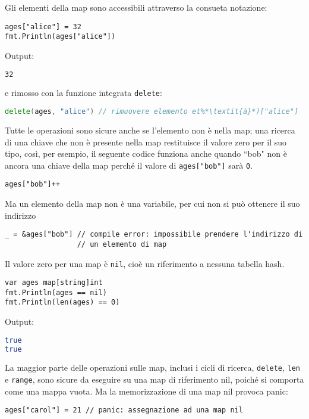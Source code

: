 \documentclass[../../thesis.tex]{subfiles}
\begin{document}
    Gli elementi della map sono accessibili attraverso la consueta notazione:
    \begin{lstlisting}[frame = single, label = {lst:lstlisting3-3.4}]
ages["alice"] = 32
fmt.Println(ages["alice"])
    \end{lstlisting}
    Output:
    \begin{lstlisting}[language = bash, frame = L, label = {lst:lstlisting3-3.5}]
32
    \end{lstlisting}
    e rimosso con la funzione integrata \verb"delete":
    \begin{lstlisting}[language = go, frame = single, label = {lst:lstlisting3-3.6}]
delete(ages, "alice") // rimuovere elemento et%*\textit{à}*)["alice"]
    \end{lstlisting}
    Tutte le operazioni sono sicure anche se l'elemento non è nella map;
    una ricerca di una chiave che non è presente nella map restituisce il valore zero per il suo tipo, così, per esempio, il seguente codice funziona anche quando ``bob" non è ancora una chiave della map perché il valore di \verb!ages["bob"]! sarà \verb"0".
    \begin{lstlisting}[frame = single, label = {lst:lstlisting3-3.7}]
ages["bob"]++
    \end{lstlisting}
    Ma un elemento della map non è una variabile, per cui non si può ottenere il suo indirizzo
    \begin{lstlisting}[frame = single, label = {lst:lstlisting3-3.8}]
_ = &ages["bob"] // compile error: impossibile prendere l'indirizzo di
                 // un elemento di map
    \end{lstlisting}
    Il valore zero per una map è \verb"nil", cioè un riferimento a nessuna tabella hash.
    \begin{lstlisting}[frame = single, label = {lst:lstlisting3-3.9}]
var ages map[string]int
fmt.Println(ages == nil)
fmt.Println(len(ages) == 0)
    \end{lstlisting}
    Output:
    \begin{lstlisting}[language = bash, frame = L, label = {lst:lstlisting3-3.10}]
true
true
    \end{lstlisting}
    La maggior parte delle operazioni sulle map, inclusi i cicli di ricerca, \verb"delete", \verb"len" e \verb"range", sono sicure da eseguire su una map di riferimento nil, poiché si comporta come una mappa vuota.
    Ma la memorizzazione di una map nil provoca panic:
    \begin{lstlisting}[frame = single, label = {lst:lstlisting3-3.11}]
ages["carol"] = 21 // panic: assegnazione ad una map nil
    \end{lstlisting}
\end{document}
